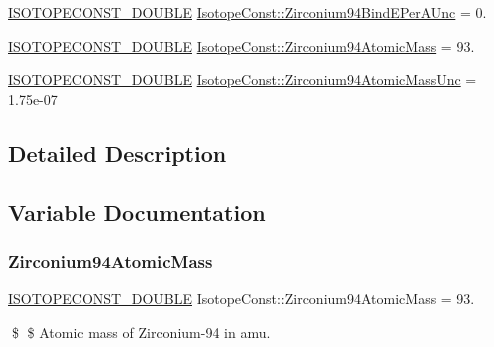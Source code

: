\begin{DoxyCompactItemize}
\mbox{\hyperlink{group___isotope_const-_macros_ga8f45a7272ce02c0b4c65c44636ed719a}{I\+S\+O\+T\+O\+P\+E\+C\+O\+N\+S\+T\+\_\+\+D\+O\+U\+B\+LE}} \mbox{\hyperlink{group___isotope_const-_zirconium-_zr94_ga6e995150fce2f287f6d106beef766cda}{Isotope\+Const\+::\+Zirconium94\+Bind\+E\+Per\+A\+Unc}} = 0.
\item 
\mbox{\hyperlink{group___isotope_const-_macros_ga8f45a7272ce02c0b4c65c44636ed719a}{I\+S\+O\+T\+O\+P\+E\+C\+O\+N\+S\+T\+\_\+\+D\+O\+U\+B\+LE}} \mbox{\hyperlink{group___isotope_const-_zirconium-_zr94_ga536f63bf26d35912d5bcc7694dc3795d}{Isotope\+Const\+::\+Zirconium94\+Atomic\+Mass}} = 93.
\item 
\mbox{\hyperlink{group___isotope_const-_macros_ga8f45a7272ce02c0b4c65c44636ed719a}{I\+S\+O\+T\+O\+P\+E\+C\+O\+N\+S\+T\+\_\+\+D\+O\+U\+B\+LE}} \mbox{\hyperlink{group___isotope_const-_zirconium-_zr94_gaeb665c4bf439f3342854b77a86d5e372}{Isotope\+Const\+::\+Zirconium94\+Atomic\+Mass\+Unc}} = 1.\+75e-\/07
\end{DoxyCompactItemize}


\subsection{Detailed Description}


\subsection{Variable Documentation}
\mbox{\label{group___isotope_const-_zirconium-_zr94_ga536f63bf26d35912d5bcc7694dc3795d}} 
\subsubsection{\texorpdfstring{Zirconium94\+Atomic\+Mass}{Zirconium94AtomicMass}}
{\footnotesize\ttfamily \mbox{\hyperlink{group___isotope_const-_macros_ga8f45a7272ce02c0b4c65c44636ed719a}{I\+S\+O\+T\+O\+P\+E\+C\+O\+N\+S\+T\+\_\+\+D\+O\+U\+B\+LE}} Isotope\+Const\+::\+Zirconium94\+Atomic\+Mass = 93.}

\$ \$ Atomic mass of Zirconium-\/94 in amu. \mbox{\label{group___isotope_const-_zirconium-_zr94_gaeb665c4bf439f3342854b77a86d5e372}} 
